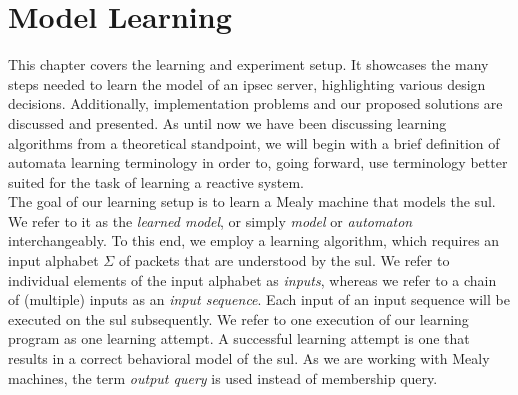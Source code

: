 %
%
% 

\chapter{Model Learning}

\label{chap:Learning}

This chapter covers the learning and experiment setup. It showcases the many steps needed to learn the model of an \ac{ipsec} server, highlighting various design decisions. Additionally, implementation problems and our proposed solutions are discussed and presented. As until now we have been discussing learning algorithms from a theoretical standpoint, we will begin with a brief definition of automata learning terminology in order to, going forward, use terminology better suited for the task of learning a reactive system. \\

The goal of our learning setup is to learn a Mealy machine that models the \ac{sul}. We refer to it as the \textit{learned model}, or simply \textit{model} or \textit{automaton} interchangeably. To this end, we employ a learning algorithm, which requires an input alphabet $\Sigma$ of packets that are understood by the \ac{sul}. We refer to individual elements of the input alphabet as \textit{inputs}, whereas we refer to a chain of (multiple) inputs as an \textit{input sequence}. Each input of an input sequence will be executed on the \ac{sul} subsequently. We refer to one execution of our learning program as one learning attempt. A successful learning attempt is one that results in a correct behavioral model of the \ac{sul}. As we are working with Mealy machines, the term \textit{output query} is used instead of membership query.

